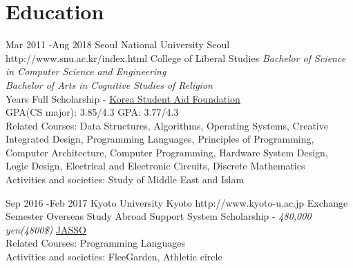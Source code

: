 \documentclass[10pt]{article} %
\begin{document}

\section{Education}

\job
{Mar 2011 -}{Aug 2018}
{Seoul National University}
{Seoul}
{http://www.snu.ac.kr/index.html}
{College of Liberal Studies}
{
\textit{Bachelor of Science in Computer Science and Engineering}\\
\if{}
\textit{Bachelor of Arts in Cognitive Studies of Religion}\\
 Years Full Scholarship - \href{http://eng.kosaf.go.kr/jsp/main.jsp}{Korea Student Aid Foundation}\\
GPA(CS major): 3.85/4.3\hspace{10mm} GPA: 3.77/4.3\\
Related Courses: Data Structures, Algorithms, Operating Systems, Creative Integrated Design, Programming Languages, Principles of Programming, Computer Architecture, Computer Programming, Hardware System Design, Logic Design, Electrical and Electronic Circuits, Discrete Mathematics
\if{}
\\
Activities and societies: Study of Middle East and Islam
\fi
}


\if{}
\job
{Sep 2016 -}{Feb 2017}
{Kyoto University}
{Kyoto}
{http://www.kyoto-u.ac.jp}
{Exchange Semester}
{
Overseas Study Abroad Support System Scholarship - \textit{480,000 yen(4800\$)} \href{http://www.jasso.go.jp/ryugaku/tantosha/study_a/short_term_h/index.html}{JASSO}\\
Related Courses: Programming Languages\\
Activities and societies: FleeGarden, Athletic circle
}

\end{document}
